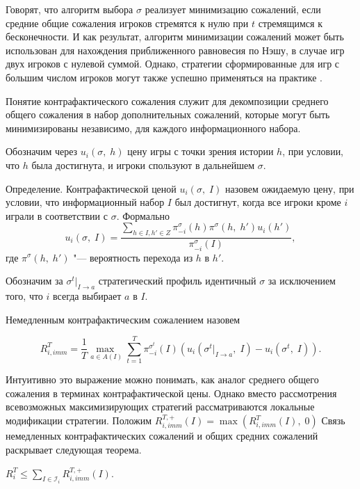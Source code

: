 Говорят, что алгоритм выбора $\sigma$ реализует минимизацию сожалений, если средние общие сожаления игроков стремятся к нулю при $t$ стремящимся к бесконечности. И как результат, алгоритм минимизации сожалений может быть использован для нахождения приближенного равновесия по Нэшу, в случае игр двух игроков с нулевой суммой. Однако, стратегии сформированные для игр с большим числом игроков могут также успешно применяться на практике \cite{aay2400}.

Понятие контрафактического сожаления служит для декомпозиции среднего общего сожаления в набор дополнительных сожалений, которые могут быть минимизированы независимо, для каждого информационного набора.  

Обозначим через $u_i(\sigma,\;h)$ цену игры с точки зрения истории $h$, при условии, что $h$ была достигнута, и игроки спользуют в дальнейшем $\sigma$. 

Определение. Контрафактической ценой $u_i(\sigma,\;I)$ назовем ожидаемую цену, при условии, что информационный набор $I$ был достигнут, когда все игроки кроме $i$ играли в соответствии с $\sigma$. Формально 
\begin{equation}
	u_i(\sigma,\;I)=\frac{\sum_{h\in I,h'\in Z}\pi_{-i}^\sigma(h)\pi^\sigma(h,\;h')u_i(h')}{\pi_{-i}^\sigma(I)},
\end{equation}
где $\pi^\sigma(h,\;h')$ "--- вероятность перехода из $h$ в $h'$.

Обозначим за $\sigma^t |_{I \to a}$ стратегический профиль идентичный $\sigma$ за исключением того, что $i$ всегда выбирает $a$ в $I$. 

Немедленным контрафактическим сожалением назовем 

\begin{equation}\label{Sych_eq1}
	R_{i,imm}^T = \frac{1}{T}\underset{a\in A(I)}{\max\;}\sum_{t=1}^{T}\pi_{-i}^{\sigma^t}(I)(u_i(\sigma^t |_{I \to a},\;I)-u_i(\sigma^t,\;I)).
\end{equation}

Интуитивно это выражение можно понимать, как аналог среднего общего сожаления в терминах контрафактической цены. Однако вместо рассмотрения всевозможных максимизирующих стратегий рассматриваются локальные модификации стратегии. Положим $R_{i,imm}^{T,+}(I) = \max (R_{i,imm}^{T}(I),\;0)$ Связь немедленных контрафактических сожалений и общих средних сожалений раскрывает следующая теорема. 

\begin{theo} 
	$R_i^T \leq \sum_{I\in \mathcal{I}_i}R_{i,imm}^{T,+}(I)$.
\end{theo}

